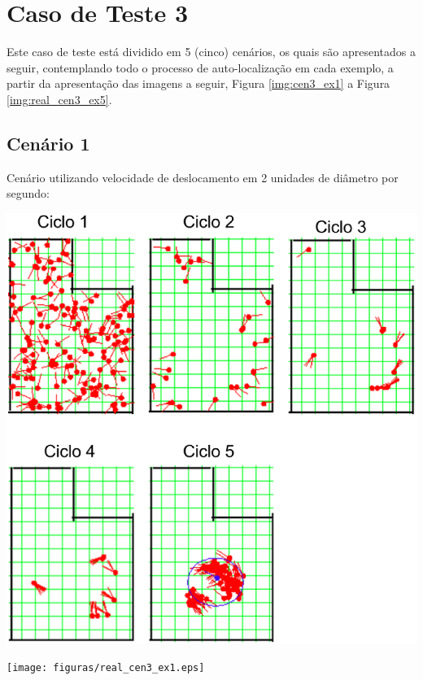 \section{Caso de Teste 3}

Este caso de teste está dividido em 5 (cinco) cenários, os quais são apresentados a seguir, contemplando todo o processo de auto-localização
em cada exemplo, a partir da apresentação das imagens a seguir, Figura \ref{img:cen3_ex1} a Figura \ref{img:real_cen3_ex5}.

\subsection{Cenário 1}

Cenário utilizando velocidade de deslocamento em 2 unidades de diâmetro por segundo:

{\centering
\includegraphics[scale=0.4]{figuras/cen3_ex1.eps}
\label{img:cen3_ex1}
\par}

{\centering
\texttt{[image: figuras/real\_cen3\_ex1.eps]}
\label{img:real_cen3_ex1}
\par}


